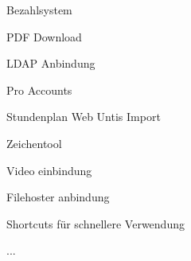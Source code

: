 
Bezahlsystem

PDF Download

LDAP Anbindung

Pro Accounts

Stundenplan Web Untis Import

Zeichentool

Video einbindung

Filehoster anbindung 

Shortcuts für schnellere Verwendung

...


